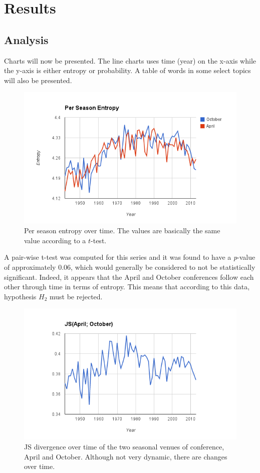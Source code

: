 \section {Results}
\label{results}

\subsection {Analysis}
Charts will now be presented. The line charts uses time (year) on the x-axis while the y-axis is either entropy or probability. A table of words in some select topics will also be presented.

\begin{figure}[center]
	\centering
	\includegraphics[width=12cm]{images/H(per-season).png}
	\caption{Per season entropy over time. The values are basically the same value according to a $t$-test.}
	\label{fig:entropy-per-season}
\end{figure}

A pair-wise t-test was computed for this series and it was found to have a \textit{p}-value of approximately $0.06$, which would generally be considered to not be statistically significant. Indeed, it appears that the April and October conferences follow each other through time in terms of entropy. This means that according to this data, hypothesis $H_2$ must be rejected.

\begin{figure}[center]
	\centering
	\includegraphics[width=12cm]{images/JS(April;Oct).png}
	\caption{JS divergence over time of the two seasonal venues of conference, April and October. Although not very dynamic, there are changes over time.}
	\label{fig:js-season}
\end{figure}

